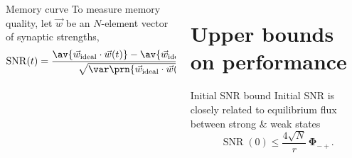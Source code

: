 \documentclass[final,hyperref={pdfpagelabels=false,bookmarks=false}]{beamer}
\DeclareMathOperator{\SNR}{SNR}
\newcommand{\pot}{^\text{pot}}
\newcommand{\dep}{^\text{dep}}
\newcommand{\I}{\mathbf{I}}
\newcommand{\eq}{\mathbf{p}^\infty}
\newcommand{\w}{\mathbf{w}}
\newcommand{\W}{\vec{w}}
\newcommand{\M}{\mathbf{M}}
\newcommand{\F}{\boldsymbol{\Phi}}
\begin{document}
\begin{frame}{}
\begin{columns}[t]
\begin{column}{0.36\linewidth}
\begin{block}{Memory curve}
 To measure memory quality, let $\W$ be an $N$-element vector of synaptic strengths,
 \begin{equation*}
   \begin{aligned}
     \SNR(t) = \frac{\av{\W_\text{ideal} \cdot \W(t)} -  \av{\W_\text{ideal} \cdot \W(\infty)} }{ \sqrt{\var\prn{\W_\text{ideal} \cdot \W(\infty)}} }.
   \end{aligned}
 \end{equation*}
%
\end{block}


\end{column}

\begin{column}{0.29\linewidth}


\section{Upper bounds on performance}


\begin{block}{Initial SNR bound}
%
 Initial SNR is closely related to equilibrium flux between strong \& weak states
 \begin{equation*}
   \SNR(0) \leq \frac{4\sqrt{N}}{r}\,\F_{-+}.
 \end{equation*}


\end{block}
\end{column}
\end{columns}
\end{frame}
\end{document}
